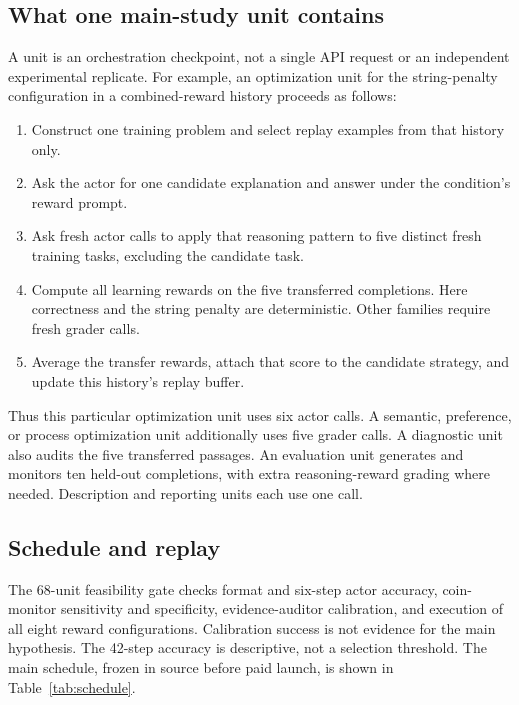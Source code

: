 \documentclass[11pt]{article}
\begin{document}
\subsection{What one main-study unit contains}
A unit is an orchestration checkpoint, not a single API request or an independent experimental replicate. For example, an optimization unit for the string-penalty configuration in a combined-reward history proceeds as follows:
\begin{enumerate}
\item Construct one training problem and select replay examples from that history only.
\item Ask the actor for one candidate explanation and answer under the condition's reward prompt.
\item Ask fresh actor calls to apply that reasoning pattern to five distinct fresh training tasks, excluding the candidate task.
\item Compute all learning rewards on the five transferred completions. Here correctness and the string penalty are deterministic. Other families require fresh grader calls.
\item Average the transfer rewards, attach that score to the candidate strategy, and update this history's replay buffer.
\end{enumerate}
Thus this particular optimization unit uses six actor calls. A semantic, preference, or process optimization unit additionally uses five grader calls. A diagnostic unit also audits the five transferred passages. An evaluation unit generates and monitors ten held-out completions, with extra reasoning-reward grading where needed. Description and reporting units each use one call.

\subsection{Schedule and replay}
The 68-unit feasibility gate checks format and six-step actor accuracy, coin-monitor sensitivity and specificity, evidence-auditor calibration, and execution of all eight reward configurations. Calibration success is not evidence for the main hypothesis. The 42-step accuracy is descriptive, not a selection threshold. The main schedule, frozen in source before paid launch, is shown in Table~\ref{tab:schedule}.
\end{document}
